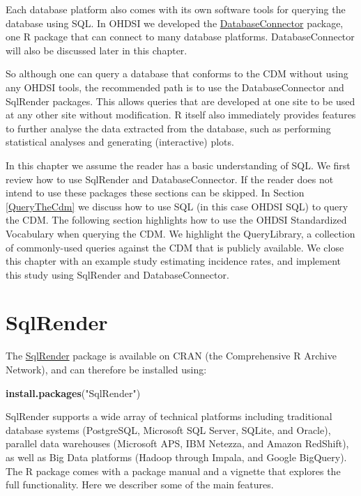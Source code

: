 \documentclass[11pt]{book}
\newenvironment{Shaded}{\begin{snugshade}}{\end{snugshade}}
\newcommand{\KeywordTok}[1]{\textcolor[rgb]{0.13,0.29,0.53}{\textbf{#1}}}
\newcommand{\NormalTok}[1]{#1}
\newcommand{\StringTok}[1]{\textcolor[rgb]{0.31,0.60,0.02}{#1}}
\theoremstyle{definition}
\theoremstyle{definition}
\theoremstyle{definition}
\theoremstyle{remark}
\begin{document}
Each database platform also comes with its own software tools for querying the database using SQL. In OHDSI we developed the \href{https://ohdsi.github.io/DatabaseConnector/}{DatabaseConnector} package, one R package that can connect to many database platforms. DatabaseConnector will also be discussed later in this chapter. 

So although one can query a database that conforms to the CDM without using any OHDSI tools, the recommended path is to use the DatabaseConnector and SqlRender packages. This allows queries that are developed at one site to be used at any other site without modification. R itself also immediately provides features to further analyse the data extracted from the database, such as performing statistical analyses and generating (interactive) plots. 

In this chapter we assume the reader has a basic understanding of SQL. We first review how to use SqlRender and DatabaseConnector. If the reader does not intend to use these packages these sections can be skipped. In Section \ref{QueryTheCdm} we discuss how to use SQL (in this case OHDSI SQL) to query the CDM. The following section highlights how to use the OHDSI Standardized Vocabulary when querying the CDM. We highlight the QueryLibrary, a collection of commonly-used queries against the CDM that is publicly available. We close this chapter with an example study estimating incidence rates, and implement this study using SqlRender and DatabaseConnector.  

\hypertarget{SqlRender}{%
\section{SqlRender}\label{SqlRender}}

The \href{https://ohdsi.github.io/SqlRender/}{SqlRender} package is available on CRAN (the Comprehensive R Archive Network), and can therefore be installed using:

\begin{Shaded}
\begin{Highlighting}[]
\KeywordTok{install.packages}\NormalTok{(}\StringTok{"SqlRender"}\NormalTok{)}
\end{Highlighting}
\end{Shaded}

SqlRender supports a wide array of technical platforms including traditional database systems (PostgreSQL, Microsoft SQL Server, SQLite, and Oracle), parallel data warehouses (Microsoft APS, IBM Netezza, and Amazon RedShift), as well as Big Data platforms (Hadoop through Impala, and Google BigQuery). The R package comes with a package manual and a vignette that explores the full functionality. Here we describer some of the main features.
\end{document}
